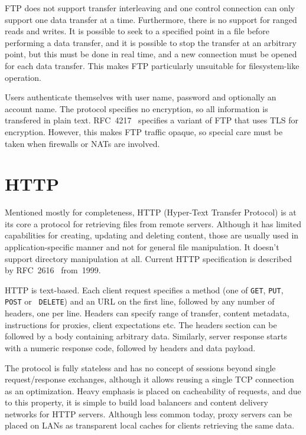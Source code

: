 FTP does not support transfer interleaving and one control connection can only support one data transfer at
a time. Furthermore, there is no support for ranged reads and writes.  It is possible to seek to a specified
point in a file before performing a data transfer, and it is possible to stop the transfer at an arbitrary
point, but this must be done in real time, and a new connection must be opened for each data transfer.  This
makes FTP particularly unsuitable for filesystem-like operation.

Users authenticate themselves with user name, password and optionally an account name. The protocol specifies
no encryption, so all information is transfered in plain text. RFC~4217~\cite{rfc4217} specifies a variant of
FTP that uses TLS for encryption. However, this makes FTP traffic opaque, so special care must be taken when
firewalls or NATs are involved.

\section{HTTP}

Mentioned mostly for completeness, HTTP (Hyper-Text Transfer Protocol) is at its core a protocol for
retrieving files from remote servers. Although it has limited capabilities for creating, updating and deleting
content, those are usually used in application-specific manner and not for general file manipulation. It
doesn't support directory manipulation at all. Current HTTP specification is described by
RFC~2616~\cite{rfc2616} from~1999.

HTTP is text-based. Each client request specifies a method (one of {\tt GET}, {\tt PUT}, {\tt POST} or {\tt
DELETE}) and an URL on the first line, followed by any number of headers, one per line.  Headers can specify
range of transfer, content metadata, instructions for proxies, client expectations etc. The headers section
can be followed by a body containing arbitrary data. Similarly, server response starts with a numeric response
code, followed by headers and data payload.

The protocol is fully stateless and has no concept of sessions beyond single request/response exchanges,
although it allows reusing a single TCP connection as an optimization. Heavy emphasis is placed on
cacheability of requests, and due to this property, it is simple to build load balancers and content delivery
networks for HTTP servers. Although less common today, proxy servers can be placed on LANs as transparent
local caches for clients retrieving the same data.


